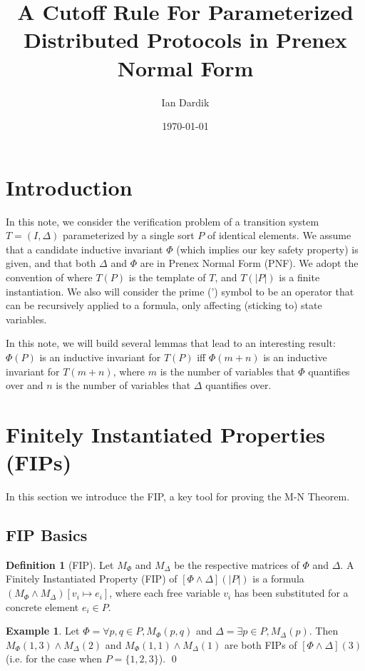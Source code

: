 \documentclass[12pt]{article}
\title{A Cutoff Rule For Parameterized Distributed Protocols in Prenex Normal Form}
\author{Ian Dardik}
\date{\today}
\theoremstyle{definition}
\newtheorem{definition}{Definition}
\newtheorem{example}{Example}
\theoremstyle{remark}
\begin{document}
\maketitle

\section{Introduction}
In this note, we consider the verification problem of a transition system $T=(I,\Delta)$ parameterized by a single sort $P$ of identical elements.  We assume that a candidate inductive invariant $\Phi$ (which implies our key safety property) is given, and that both $\Delta$ and $\Phi$ are in Prenex Normal Form (PNF).  We adopt the convention of \cite{goel2021symmetry} where $T(P)$ is the template of $T$, and $T(|P|)$ is a finite instantiation.  We also will consider the prime (') symbol to be an operator that can be recursively applied to a formula, only affecting (sticking to) state variables.

In this note, we will build several lemmas that lead to an interesting result: $\Phi(P)$ is an inductive invariant for $T(P)$ iff $\Phi(m+n)$ is an inductive invariant for $T(m+n)$, where $m$ is the number of variables that $\Phi$ quantifies over and $n$ is the number of variables that $\Delta$ quantifies over.


\section{Finitely Instantiated Properties (FIPs)}
In this section we introduce the FIP, a key tool for proving the M-N Theorem.

\subsection{FIP Basics}

\begin{definition}[FIP]
  Let $M_{\Phi}$ and $M_{\Delta}$ be the respective matrices of $\Phi$ and $\Delta$.  A Finitely Instantiated Property (FIP) of $[\Phi\land\Delta](|P|)$ is a formula $(M_{\Phi} \land M_{\Delta})[v_i \mapsto e_i]$, where each free variable $v_i$ has been substituted for a concrete element $e_i \in P$.  
\end{definition}

\begin{example}
  Let $\Phi = \forall p,q \in P, M_{\Phi}(p,q)$ and $\Delta = \exists p \in P, M_{\Delta}(p)$.  Then $M_{\Phi}(1,3) \land M_{\Delta}(2)$ and $M_{\Phi}(1,1) \land M_{\Delta}(1)$ are both FIPs of $[\Phi\land\Delta](3)$ (i.e. for the case when $P=\{1,2,3\}$).  
  \qed
\end{example}
\end{document}
